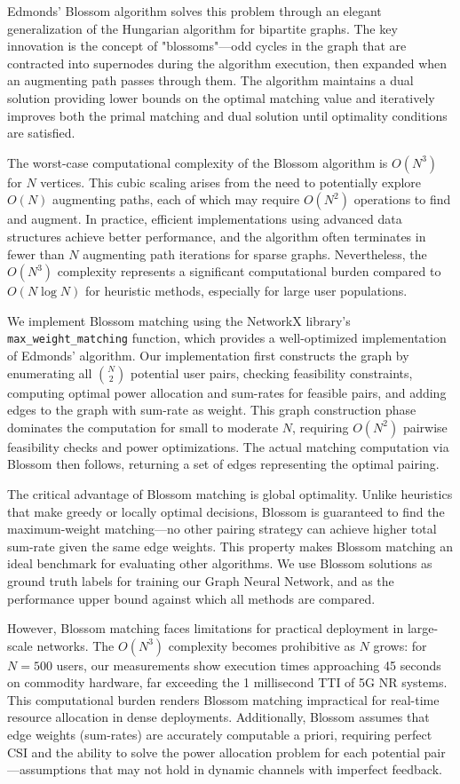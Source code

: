 Edmonds' Blossom algorithm solves this problem through an elegant generalization of the Hungarian algorithm for bipartite graphs. The key innovation is the concept of "blossoms"—odd cycles in the graph that are contracted into supernodes during the algorithm execution, then expanded when an augmenting path passes through them. The algorithm maintains a dual solution providing lower bounds on the optimal matching value and iteratively improves both the primal matching and dual solution until optimality conditions are satisfied.

The worst-case computational complexity of the Blossom algorithm is $O(N^3)$ for $N$ vertices. This cubic scaling arises from the need to potentially explore $O(N)$ augmenting paths, each of which may require $O(N^2)$ operations to find and augment. In practice, efficient implementations using advanced data structures achieve better performance, and the algorithm often terminates in fewer than $N$ augmenting path iterations for sparse graphs. Nevertheless, the $O(N^3)$ complexity represents a significant computational burden compared to $O(N \log N)$ for heuristic methods, especially for large user populations.

We implement Blossom matching using the NetworkX library's \texttt{max\_weight\_matching} function, which provides a well-optimized implementation of Edmonds' algorithm. Our implementation first constructs the graph by enumerating all $\binom{N}{2}$ potential user pairs, checking feasibility constraints, computing optimal power allocation and sum-rates for feasible pairs, and adding edges to the graph with sum-rate as weight. This graph construction phase dominates the computation for small to moderate $N$, requiring $O(N^2)$ pairwise feasibility checks and power optimizations. The actual matching computation via Blossom then follows, returning a set of edges representing the optimal pairing.

The critical advantage of Blossom matching is global optimality. Unlike heuristics that make greedy or locally optimal decisions, Blossom is guaranteed to find the maximum-weight matching—no other pairing strategy can achieve higher total sum-rate given the same edge weights. This property makes Blossom matching an ideal benchmark for evaluating other algorithms. We use Blossom solutions as ground truth labels for training our Graph Neural Network, and as the performance upper bound against which all methods are compared.

However, Blossom matching faces limitations for practical deployment in large-scale networks. The $O(N^3)$ complexity becomes prohibitive as $N$ grows: for $N = 500$ users, our measurements show execution times approaching 45 seconds on commodity hardware, far exceeding the 1 millisecond TTI of 5G NR systems. This computational burden renders Blossom matching impractical for real-time resource allocation in dense deployments. Additionally, Blossom assumes that edge weights (sum-rates) are accurately computable a priori, requiring perfect CSI and the ability to solve the power allocation problem for each potential pair—assumptions that may not hold in dynamic channels with imperfect feedback.


